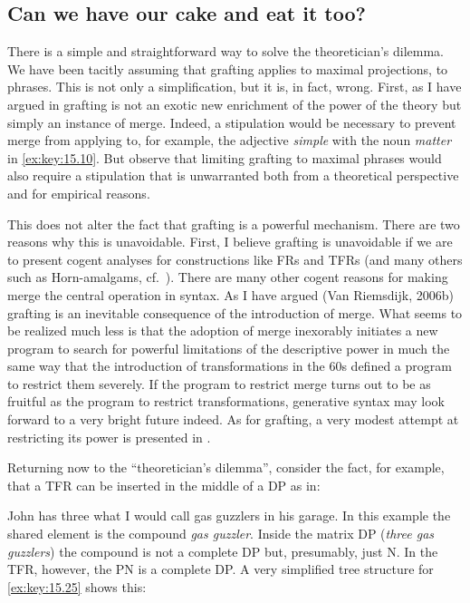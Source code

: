 \documentclass[output=paper]{langsci/langscibook}
\begin{document}
\begin{refcontext}
\section{Can we have our cake and eat it too?}\label{sec:key:15.3}

There is a simple and straightforward way to solve the theoretician’s dilemma.
We have been tacitly assuming that grafting applies to maximal projections, to
phrases. This is not only a simplification, but it is, in fact, wrong. First,
as I have argued in \citet{VanRiemsdijk2006b} grafting is not an exotic new
enrichment of the power of the theory but simply an instance of merge. Indeed,
a stipulation would be necessary to prevent merge from applying to, for
example, the adjective \emph{simple} with the noun \emph{matter} in \eqref{ex:key:15.10}.
But observe that limiting grafting to maximal phrases would also require a
stipulation that is unwarranted both from a theoretical perspective and for
empirical reasons.

This does not alter the fact that grafting is a powerful mechanism.  There are
two reasons why this is unavoidable. First, I believe grafting is unavoidable
if we are to present cogent analyses for constructions like \glspl{FR} and
\glspl{TFR} (and many others such as Horn-amalgams, cf.\
\citet{VanRiemsdijk2006c}). There are many other cogent reasons for making
merge the central operation in syntax. As I have argued (Van Riemsdijk, 2006b)
grafting is an inevitable consequence of the introduction of merge.  What seems
to be realized much less is that the adoption of merge inexorably initiates a
new program to search for powerful limitations of the descriptive power in much
the same way that the introduction of transformations in the 60s defined a
program to restrict them severely. If the program to restrict merge turns out
to be as fruitful as the program to restrict transformations, generative syntax
may look forward to a very bright future indeed. As for grafting, a very modest
attempt at restricting its power is presented in \citet{VanRiemsdijk2010}.

Returning now to the \enquote{theoretician’s dilemma}, consider the fact, for
example, that a \gls{TFR} can be inserted in the middle of a DP as in:

\ea\label{ex:key:15.25}
    John has three what I would call gas guzzlers in his garage.
\z
In this example the shared element is the compound \emph{gas guzzler}.  Inside
the matrix DP (\emph{three gas guzzlers}) the compound is not a complete DP
but, presumably, just N. In the \gls{TFR}, however, the \gls{PN} is a complete
DP\@. A very simplified tree structure for \eqref{ex:key:15.25} shows this:


\end{refcontext}
\end{document}
